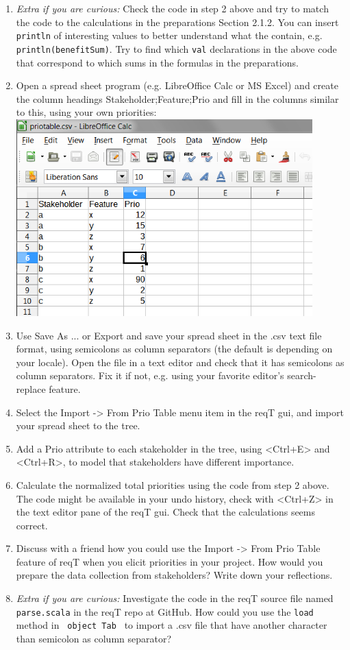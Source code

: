 \documentclass[11pt]{article}
\begin{document}
\begin{framed}
\begin{enumerate}
\item {\it Extra if you are curious:} Check the code in step 2 above and try to match the code to the calculations in the preparations Section 2.1.2. You can insert \verb+println+ of interesting values to better understand what the contain, e.g. \verb+println(benefitSum)+. Try to find which {\verb+val+} declarations in the above code that correspond to which sums in the formulas in the preparations. 
\item Open a spread sheet program (e.g. LibreOffice Calc or MS Excel) and create the column headings Stakeholder;Feature;Prio and fill in the columns similar to this, using your own priorities:
\includegraphics[width=0.9\textwidth]{spread-sheet.png}
\item Use Save As ... or Export and save your spread sheet in the .csv text file format, using semicolons as column separators (the default is depending on your locale). Open the file in a text editor and check that it has semicolons as column separators. Fix it if not, e.g. using your favorite editor's search-replace feature.
\item Select the Import -> From Prio Table menu item in the reqT gui, and import your spread sheet to the tree.
\item Add a Prio attribute to each stakeholder in the tree, using <Ctrl+E> and <Ctrl+R>, to model that stakeholders have different importance. 
\item Calculate the normalized total priorities using the code from step 2 above. The code might be available in your undo history, check with <Ctrl+Z> in the text editor pane of the reqT gui. Check that the calculations seems correct.
\item Discuss with a friend how you could use the Import -> From Prio Table feature of reqT when you elicit priorities in your project. How would you prepare the data collection from stakeholders? Write down your reflections.
\vspace{12em}
\item {\it Extra if you are curious:} Investigate the code in the reqT source file named \verb+parse.scala+ in the reqT repo at GitHub. How could you use the \verb+load+ method in \verb+ object Tab + to import a .csv file that have another character than semicolon as column separator? 
\end{enumerate}


\end{framed}
\end{document}
